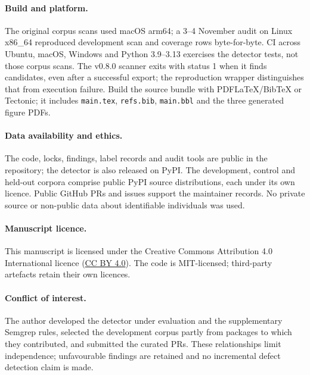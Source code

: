 \documentclass[10pt,a4paper]{article}
\begin{document}
\paragraph{Build and platform.}
The original corpus scans used macOS arm64; a 3--4 November audit on Linux
x86\_64 reproduced development scan and coverage rows byte-for-byte.
CI across Ubuntu, macOS, Windows and Python 3.9--3.13 exercises the detector
tests, not those corpus scans. The v0.8.0 scanner exits with status 1 when
it finds candidates, even after a successful export; the reproduction
wrapper distinguishes that from execution failure. Build the source bundle
with PDFLaTeX/BibTeX or Tectonic; it includes \texttt{main.tex},
\texttt{refs.bib}, \texttt{main.bbl} and the three generated figure PDFs.

\paragraph{Data availability and ethics.}
The code, locks, findings, label records and audit tools are public in the
repository; the detector is also released on PyPI. The development, control
and held-out corpora comprise public PyPI source distributions, each under
its own licence. Public GitHub PRs and issues support the maintainer records.
No private source or non-public data about identifiable individuals was used.

\paragraph{Manuscript licence.}
This manuscript is licensed under the Creative Commons Attribution 4.0
International licence
(\href{https://creativecommons.org/licenses/by/4.0/}{CC BY 4.0}).
The code is MIT-licensed; third-party artefacts retain their own licences.

\paragraph{Conflict of interest.}
The author developed the detector under evaluation and the supplementary
Semgrep rules, selected the development corpus partly from packages to which
they contributed, and submitted the curated PRs. These relationships limit
independence; unfavourable findings are retained and no incremental defect
detection claim is made.

\clearpage
{\small\raggedright


}
\end{document}
